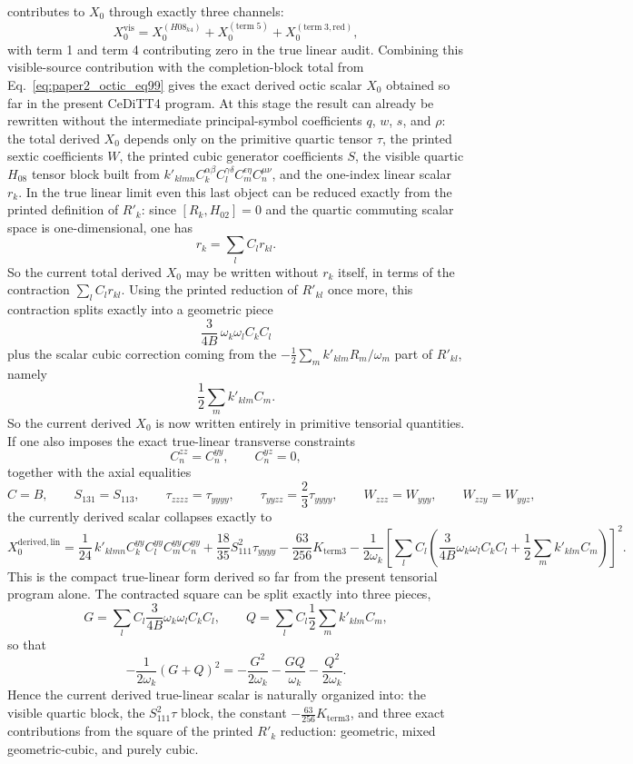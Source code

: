\documentclass[aip,jcp,reprint,floatfix]{revtex4-2}
\begin{document}
contributes to \(X_0\) through exactly three channels:
\begin{equation}
X_0^{\mathrm{vis}}
=
X_0^{(H08_{k4})}
+X_0^{(\mathrm{term}\;5)}
+X_0^{(\mathrm{term}\;3,\mathrm{red})},
\end{equation}
with term 1 and term 4 contributing zero in the true linear audit.
Combining this visible-source contribution with the completion-block total from
Eq.~\eqref{eq:paper2_octic_eq99} gives the exact derived octic scalar
\(X_0\) obtained so far in the present CeDiTT4 program.
At this stage the result can already be rewritten without the intermediate
principal-symbol coefficients \(q\), \(w\), \(s\), and \(\rho\): the total
derived \(X_0\) depends only on the primitive quartic tensor \(\tau\), the
printed sextic coefficients \(W\), the printed cubic generator coefficients
\(S\), the visible quartic \(H_{08}\) tensor block built from
\(k'_{klmn}C_k^{\alpha\beta}C_l^{\gamma\delta}C_m^{\epsilon\eta}C_n^{\mu\nu}\),
and the one-index linear scalar \(r_k\). In the true linear limit even this
last object can be reduced exactly from the printed definition of \(R'_k\):
since \([R_k,H_{02}]=0\) and the quartic commuting scalar space is
one-dimensional, one has
\[
r_k=\sum_l C_l r_{kl}.
\]
So the current total derived \(X_0\) may be written without \(r_k\) itself, in
terms of the contraction \(\sum_l C_l r_{kl}\). Using the printed reduction of
\(R'_{kl}\) once more, this contraction splits exactly into a geometric piece
\[
\frac{3}{4B}\,\omega_k\omega_l C_k C_l
\]
plus the scalar cubic correction coming from the
\(-\frac12\sum_m k'_{klm}R_m/\omega_m\) part of \(R'_{kl}\), namely
\[
\frac12\sum_m k'_{klm}C_m.
\]
So the current derived \(X_0\) is now written entirely in primitive tensorial
quantities.
If one also imposes the exact true-linear transverse constraints
\[
C_n^{zz}=C_n^{yy},\qquad C_n^{yz}=0,
\]
together with the axial equalities
\[
C=B,\qquad S_{131}=S_{113},\qquad \tau_{zzzz}=\tau_{yyyy},\qquad
\tau_{yyzz}=\frac{2}{3}\tau_{yyyy},\qquad W_{zzz}=W_{yyy},\qquad
W_{zzy}=W_{yyz},
\]
the currently derived scalar collapses exactly to
\begin{equation}
X_0^{\mathrm{derived,lin}}
=
\frac{1}{24}\,k'_{klmn} C_k^{yy} C_l^{yy} C_m^{yy} C_n^{yy}
+\frac{18}{35}S_{111}^2\tau_{yyyy}
-\frac{63}{256}K_{\mathrm{term3}}
-\frac{1}{2\omega_k}
\left[
\sum_l C_l\left(
\frac{3}{4B}\omega_k\omega_l C_k C_l
+\frac12\sum_m k'_{klm}C_m
\right)
\right]^2.
\end{equation}
This is the compact true-linear form derived so far from the present tensorial
program alone.
The contracted square can be split exactly into three pieces,
\[
G=\sum_l C_l\frac{3}{4B}\omega_k\omega_l C_k C_l,\qquad
Q=\sum_l C_l\frac12\sum_m k'_{klm}C_m,
\]
so that
\[
-\frac{1}{2\omega_k}(G+Q)^2
=
-\frac{G^2}{2\omega_k}
-\frac{GQ}{\omega_k}
-\frac{Q^2}{2\omega_k}.
\]
Hence the current derived true-linear scalar is naturally organized into:
the visible quartic block, the \(S_{111}^2\tau\) block, the constant
\(-\frac{63}{256}K_{\mathrm{term3}}\), and three exact contributions from the square of the printed
\(R'_k\) reduction: geometric, mixed geometric-cubic, and purely cubic.
\end{document}
